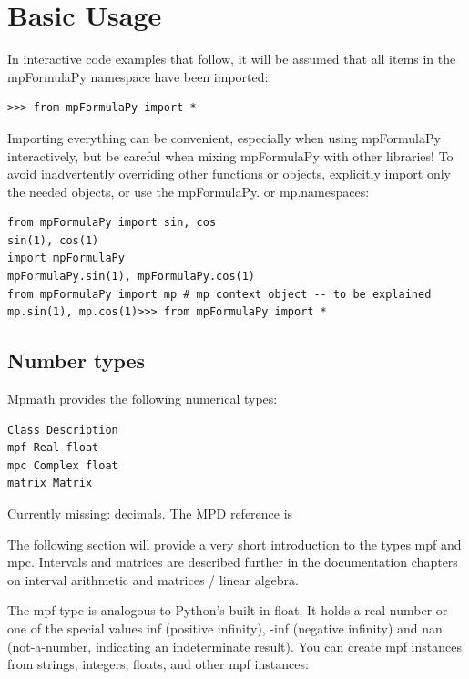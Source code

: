\chapter{Basic Usage}





In interactive code examples that follow, it will be assumed that all items in the mpFormulaPy
namespace have been imported:

\begin{lstlisting}
>>> from mpFormulaPy import *
\end{lstlisting}

Importing everything can be convenient, especially when using mpFormulaPy interactively, but be careful when mixing mpFormulaPy with other libraries! To avoid inadvertently overriding other functions or objects, explicitly import only the needed objects, or use the mpFormulaPy. or mp.namespaces:


\begin{lstlisting}
from mpFormulaPy import sin, cos
sin(1), cos(1)
import mpFormulaPy
mpFormulaPy.sin(1), mpFormulaPy.cos(1)
from mpFormulaPy import mp # mp context object -- to be explained
mp.sin(1), mp.cos(1)>>> from mpFormulaPy import *
\end{lstlisting}



\section{Number types}
Mpmath provides the following numerical types:

\begin{verbatim}
Class Description
mpf Real float
mpc Complex float
matrix Matrix
\end{verbatim}


Currently missing: decimals. The MPD reference is \cite{mpd_2012}


The following section will provide a very short introduction to the types mpf and mpc. Intervals and matrices are described further in the documentation chapters on interval arithmetic and matrices / linear algebra.

\vpara
The mpf type is analogous to Python's built-in float. It holds a real number or one of the special values inf (positive infinity), -inf (negative infinity) and nan (not-a-number, indicating an indeterminate result). You can create mpf instances from strings, integers, floats, and
other mpf instances:

